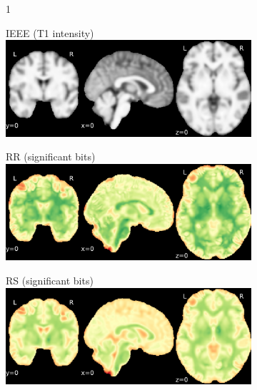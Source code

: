 \documentclass{article}
\begin{document}
\begin{appendices}
\begin{landscape}
\begin{figure}
            \vspace*{-2cm}
            \centering
            \begin{subfigure}[b][][c]{0.01\paperwidth} 1 \vspace*{-45pt} \end{subfigure}
            \begin{subfigure}[t]{0.2\paperheight}
                \centering
                IEEE (T1 intensity)
                \includegraphics[width=\textwidth]{figures/sig/5mm/ieee_ds001600_sub-1.pdf}
            \end{subfigure}
            \begin{subfigure}[t]{0.2\paperheight}
                \centering
                RR (significant bits)
                \includegraphics[width=\textwidth]{figures/sig/5mm/rr_ds001600_sub-1_sig.pdf}
            \end{subfigure}
            \begin{subfigure}[t]{0.2\paperheight}
                \centering
                RS (significant bits)
                \includegraphics[width=\textwidth]{figures/sig/5mm/rs_ds001600_sub-1_sig.pdf}

\end{subfigure}
\end{figure}
\end{landscape}
\end{appendices}
\end{document}
